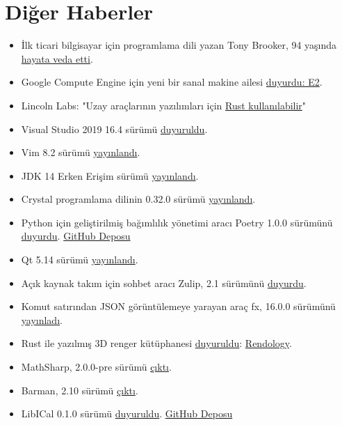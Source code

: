 \documentclass[11pt]{article}
\begin{document}
\section{Diğer Haberler}
\label{sec:orga03a56d}
\begin{itemize}
\item İlk ticari bilgisayar için programlama dili yazan Tony Brooker, 94
yaşında \href{https://www.nytimes.com/2019/12/13/technology/tony-brooker-dead.html}{hayata veda etti}.
\item Google Compute Engine için yeni bir sanal makine ailesi \href{https://cloud.google.com/blog/products/compute/google-compute-engine-gets-new-e2-vm-machine-types}{duyurdu:
E2}.
\item Lincoln Labs: "Uzay araçlarının yazılımları için \href{https://www.reddit.com/r/rust/comments/earm80/lincoln\_labs\_endorses\_rust\_for\_spacecraft/}{Rust kullanılabilir}"
\item Visual Studio 2019 16.4 sürümü \href{https://docs.microsoft.com/en-us/visualstudio/releases/2019/release-notes}{duyuruldu}.
\item Vim 8.2 sürümü \href{https://www.vim.org/vim-8.2-released.php}{yayınlandı}.
\item JDK 14 Erken Erişim sürümü \href{https://jdk.java.net/14/}{yayınlandı}.
\item Crystal programlama dilinin 0.32.0 sürümü \href{https://crystal-lang.org/2019/12/11/crystal-0.32.0-released.html}{yayınlandı}.
\item Python için geliştirilmiş bağımlılık yönetimi aracı Poetry 1.0.0
sürümünü \href{https://python-poetry.org/blog/announcing-poetry-1-0-0.html}{duyurdu}. \href{https://github.com/python-poetry/poetry}{GitHub Deposu}
\item Qt 5.14 sürümü \href{https://www.qt.io/blog/qt-5.14-has-released}{yayınlandı}.
\item Açık kaynak takım için sohbet aracı Zulip, 2.1 sürümünü \href{https://blog.zulip.org/2019/12/13/zulip-2-1-released/}{duyurdu}.
\item Komut satırından JSON görüntülemeye yarayan araç fx, 16.0.0
sürümünü \href{https://github.com/antonmedv/fx/releases/tag/16.0.0}{yayınladı}.
\item Rust ile yazılmış 3D renger kütüphanesi \href{https://leod.github.io/rust/gamedev/rendology/2019/12/13/introduction-to-rendology.html}{duyuruldu}: \href{https://github.com/leod/rendology}{Rendology}.
\item MathSharp, 2.0.0-pre sürümü \href{https://www.nuget.org/packages/MathSharp/}{çıktı}.
\item Barman, 2.10 sürümü \href{https://www.pgbarman.org/barman-2-10-released/}{çıktı}.
\item LibICal 0.1.0 sürümü \href{https://imag-pim.org/blog/2019/12/13/libical-v0.1.0/}{duyuruldu}. \href{https://github.com/matthiasbeyer/libical/}{GitHub Deposu}
\end{itemize}
\end{document}
